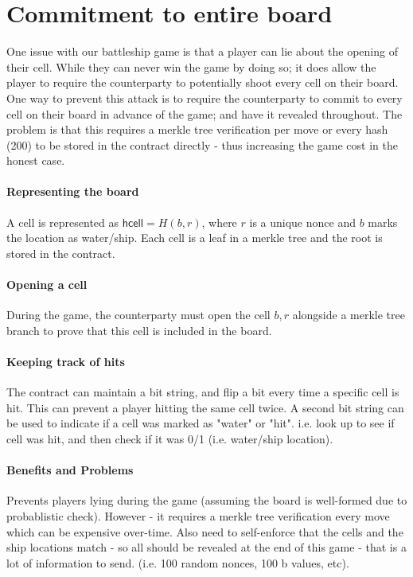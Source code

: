 \documentclass{llncs}
\newcommand{\hcell}{\mathsf{hcell}}
\begin{document}
\newpage 
\appendix

\section{Commitment to entire board}

One issue with our battleship game is that a player can lie about the opening of their cell. While they can never win the game by doing so; it does allow the player to require the counterparty to potentially shoot every cell on their board. One way to prevent this attack is to require the counterparty to commit to every cell on their board in advance of the game; and have it revealed throughout. The problem is that this requires a merkle tree verification per move or every hash (200) to be stored in the contract directly - thus increasing the game cost in the honest case. 


\paragraph{Representing the board}

A cell is represented as $\hcell = H(b, r)$, where  $r$ is a unique nonce and $b$ marks the location as water/ship. 
Each cell is a leaf in a merkle tree and the root is stored in the contract. 

\paragraph{Opening a cell} 

During the game, the counterparty must open the cell $b,r$ alongside a merkle tree branch to prove that this cell is included in the board. 

\paragraph{Keeping track of hits} The contract can maintain a bit string, and flip a bit every time a specific cell is hit. This can prevent a player hitting the same cell twice. A second bit string can be used to indicate if a cell was marked as "water" or "hit". i.e. look up to see if cell was hit, and then check if it was 0/1 (i.e. water/ship location). 

\paragraph{Benefits and Problems} Prevents players lying during the game (assuming the board is well-formed due to probablistic check). However - it requires a merkle tree verification every move which can be expensive over-time. Also need to self-enforce that the cells and the ship locations match - so all should be revealed at the end of this game - that is a lot of information to send. (i.e. 100 random nonces, 100 b values, etc). 
\end{document}
